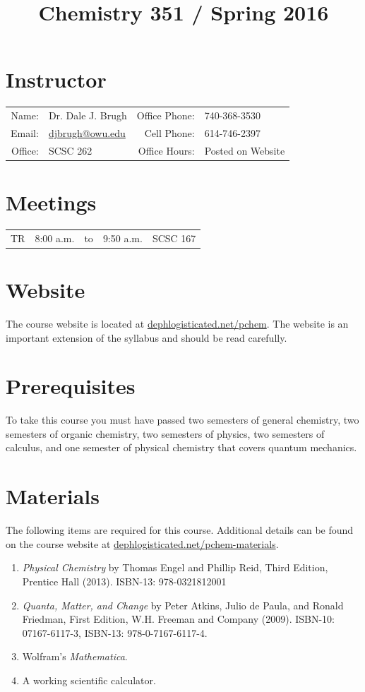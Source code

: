 \documentclass[letterpaper,oneside,onecolumn,11pt,article]{memoir}
\title{Chemistry 351 / Spring 2016}
\date{}
\author{}
\begin{document}
\maketitle
\thispagestyle{courseinformationtitle}
%
%
\section{Instructor}
\begin{tabular}{rl|rl}
Name: & Dr. Dale J. Brugh & Office Phone: & 740-368-3530 \\
Email: & \href{mailto:djbrugh@owu.edu}{djbrugh@owu.edu} & Cell Phone: & 614-746-2397 \\
Office: & SCSC 262 & Office Hours: & Posted on Website \\
\end{tabular}
%
%
\section{Meetings}
\begin{tabular}{crcrl}
TR & 8:00 a.m. & to & 9:50 a.m. & SCSC 167\\
\end{tabular}
%
%
\section{Website}
The course website is located at \href{https://dephlogisticated.net/chem351/lecture/}{dephlogisticated.net/pchem}. The website is an important extension of the syllabus and should be read carefully.
%
%
\section{Prerequisites}
To take this course you must have passed two semesters of general chemistry, two semesters of organic chemistry, two semesters of physics, two semesters of calculus, and one semester of physical chemistry that covers quantum mechanics.
%
%
\section{Materials}
The following items are required for this course. Additional details can be found on the course website at \href{http://dephlogisticated.net/pchem-materials}{dephlogisticated.net/pchem-materials}.
\begin{enumerate}
\item \emph{Physical Chemistry} by Thomas Engel and Phillip Reid, Third Edition, Prentice Hall (2013).  ISBN-13: 978-0321812001
\item \emph{Quanta, Matter, and Change} by Peter Atkins, Julio de Paula, and Ronald Friedman, First Edition, W.H. Freeman and Company (2009). ISBN-10: 07167-6117-3, ISBN-13: 978-0-7167-6117-4.
\item Wolfram's \emph{Mathematica}.
\item A working scientific calculator.
\end{enumerate}
%
%
\end{document}
